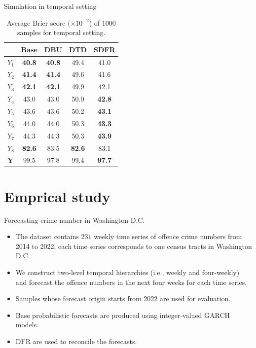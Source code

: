 \documentclass[12pt]{beamer}
\begin{document}
\begin{frame}{Simulation in temporal setting}
    \begin{table}
        \centering
        \caption{Average Brier score ($\times 10^{-2}$) of $1000$ samples for temporal setting.}
        \begin{tabular}{lcccc}
        \toprule
         & Base & DBU & DTD & SDFR \\\midrule
        $Y_1$ & \textbf{40.8} & \textbf{40.8} & 49.4 & 41.0 \\
        $Y_2$ & \textbf{41.4} & \textbf{41.4} & 49.6 & 41.6\\
        $Y_3$ & \textbf{42.1} & \textbf{42.1} & 49.9 & 42.1\\
        $Y_4$ & 43.0 & 43.0  & 50.0          & \textbf{42.8}\\
        $Y_5$ & 43.6 & 43.6  & 50.2          & \textbf{43.1} \\
        $Y_6$ & 44.0 & 44.0  & 50.3          & \textbf{43.3} \\
        $Y_7$ & 44.3 & 44.3  & 50.3          & \textbf{43.9} \\
        $Y_8$ & \textbf{82.6} & 83.5          & \textbf{82.6} & 83.1\\
        $\mathbf{Y}$ & 99.5 & 97.8  & 99.4          & \textbf{97.7} \\
        \bottomrule
        \end{tabular}
    \end{table}
\end{frame}

\section{Emprical study}

\begin{frame}{Forecasting crime number in Washington D.C.}
\begin{itemize}
    \item The dataset contains $231$ weekly time series of offence crime numbers from 2014 to 2022; each time series corresponds to one census tracts in Washington D.C.
    \item We construct two-level temporal hierarchies (i.e., weekly and four-weekly) and forecast the offence numbers in the next four weeks for each time series.
    
    \item Samples whose forecast origin starts from 2022 are used for evaluation.
    \item Base probabilistic forecasts are produced using integer-valued GARCH models.
    \item DFR are used to reconcile the forecasts.
\end{itemize}    
\end{frame}
\end{document}
